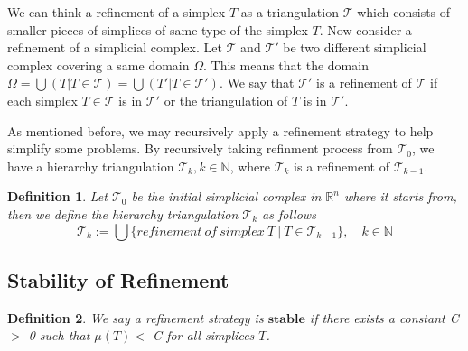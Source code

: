 \documentclass{article}
\newtheorem*{definition*}{Definition}
\begin{document}
    We can think a refinement of a simplex $T$ as a triangulation $\mathcal{T}$ which consists of smaller pieces of simplices of same type of the simplex $T$. Now consider a refinement of a simplicial complex. Let $\mathcal{T}$ and $\mathcal{T'}$ be two different simplicial complex covering a same domain $\Omega$. This means that the domain \(\Omega = \displaystyle \bigcup({T \vert T\in \mathcal{T}}) = \bigcup({T' \vert T\in \mathcal{T'}})\). We say that $\mathcal{T'}$ is a refinement of $\mathcal{T}$ if each simplex $T\in\mathcal{T}$ is in $\mathcal{T'}$ or the triangulation of $T$ is in $\mathcal{T'}$.

    As mentioned before, we may recursively apply a refinement strategy to help simplify some problems. By recursively taking refinment process from $\mathcal{T}_0$, we have a hierarchy triangulation $\mathcal{T}_k, k\in\mathbb{N}$, where $\mathcal{T}_k$ is a refinement of $\mathcal{T}_{k-1}$. 
    \begin{definition*}
    Let $\mathcal{T}_0$ be the initial simplicial complex in $\mathbb{R}^n$ where it starts from, then we define the hierarchy triangulation $\mathcal{T}_k$ as follows
    \begin{equation*}
    \mathcal{T}_k := \bigcup\{refinement~of~simplex~T ~\vert ~T\in\mathcal{T}_{k-1}\}, \quad k\in\mathbb{N}
    \end{equation*}
    \end{definition*}

    \subsection{Stability of Refinement}
    \begin{definition*}
    We say a refinement strategy is $\textbf{stable}$ if there exists a constant C $>$ 0 such that $\mu(T)<$ C for all simplices $T$.
    \end{definition*}
    
\end{document}
